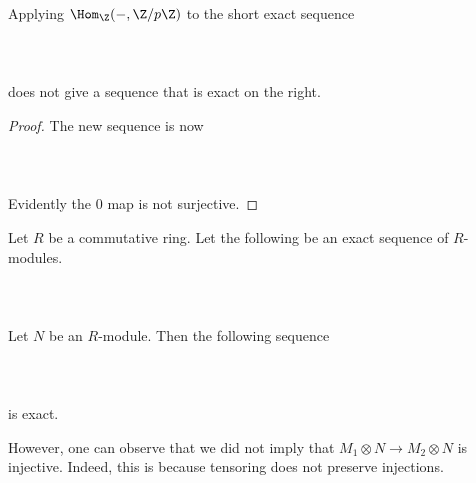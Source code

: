 \documentclass[a4paper]{article}
\begin{document}
\begin{eg}{}{} Applying $\Hom_\Z(-,\Z/p\Z)$ to the short exact sequence \\~\\
\\~\\
does not give a sequence that is exact on the right. \tcbline
\begin{proof}
The new sequence is now \\~\\
\\~\\
Evidently the $0$ map is not surjective. 
\end{proof}
\end{eg}

\begin{prp}{}{} Let $R$ be a commutative ring. Let the following be an exact sequence of $R$-modules. \\~\\
\\~\\ Let $N$ be an $R$-module. Then the following sequence \\~\\
 \\~\\
is exact. 
\end{prp}

However, one can observe that we did not imply that $M_1\otimes N\to M_2\otimes N$ is injective. Indeed, this is because tensoring does not preserve injections. 
\end{document}

